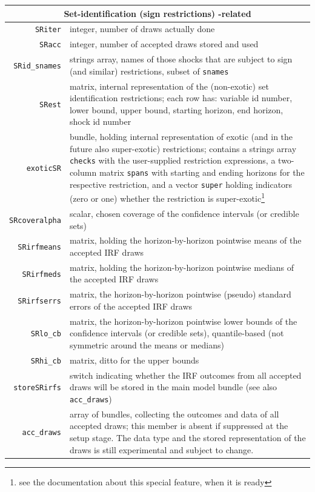 \documentclass[a4paper,10pt]{article}
\begin{document}
    \begin{tabular}{rp{}}
    \hline
    \multicolumn{2}{c}{\textbf{Set-identification (sign restrictions) -related}} \\
    \hline 
    \texttt{SRiter} & integer, number of draws actually done \\
    \texttt{SRacc} & integer, number of accepted draws stored and used\\
    \texttt{SRid\_snames} & strings array, names of those shocks that are subject 
      to sign (and similar) restrictions, subset of \texttt{snames}\\
    \texttt{SRest} & matrix, internal representation of the (non-exotic) set identification
    restrictions; each row has: variable id number, lower bound, upper bound, starting
   horizon, end horizon, shock id number  \\
   \texttt{exoticSR} & bundle, holding internal representation of exotic (and in the future also 
   super-exotic) restrictions; contains a strings array \texttt{checks} with the user-supplied
   restriction expressions, a two-column matrix \texttt{spans} with starting and ending horizons
   for the respective restriction, and a vector \texttt{super} holding indicators (zero or one) 
   whether the restriction is super-exotic\footnote{see the documentation about this special feature,
   when it is ready}\\
   \texttt{SRcoveralpha} & scalar, chosen coverage of the confidence intervals (or credible sets)\\
   \texttt{SRirfmeans} & matrix, holding the horizon-by-horizon pointwise means of 
   the accepted IRF draws\\
    \texttt{SRirfmeds} & matrix, holding the horizon-by-horizon pointwise medians of 
   the accepted IRF draws\\
   \texttt{SRirfserrs} & matrix, the horizon-by-horizon pointwise (pseudo) standard errors
  of the accepted IRF draws\\
  \texttt{SRlo\_cb} & matrix, the horizon-by-horizon pointwise lower bounds of the 
  confidence intervals (or credible sets), quantile-based (not symmetric around the 
  means or medians)\\
  \texttt{SRhi\_cb} & matrix, ditto for the upper bounds\\
   \texttt{storeSRirfs} & switch indicating whether the IRF outcomes from all accepted draws
     will be stored in the main model bundle (see also \texttt{acc\_draws})\\
   \texttt{acc\_draws} & array of bundles, collecting the outcomes and data of all accepted 
   draws; this member is absent if suppressed at the setup stage. The data type and the 
   stored representation of the draws is still experimental and subject to change.
  \end{tabular}
  
\end{document}
